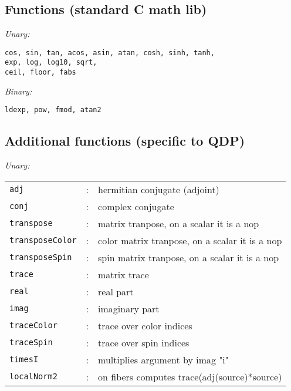 \documentclass[12pt,letterpaper]{article}
\begin{document}
\medskip


\subsection{Functions (standard C math lib)}
\label{sec:cfuncs}

\noindent
{\em Unary:}

\begin{verbatim}
cos, sin, tan, acos, asin, atan, cosh, sinh, tanh,
exp, log, log10, sqrt,
ceil, floor, fabs
\end{verbatim}

\noindent
{\em Binary:}

\begin{verbatim}
ldexp, pow, fmod, atan2
\end{verbatim}

\medskip


\subsection{Additional functions (specific to QDP)}
\label{sec:funcs}

\noindent
{\em Unary:}

\begin{flushleft}
\begin{tabular}{lcp{4.0in}}
\verb|adj|              &:& hermitian conjugate (adjoint)\\
\verb|conj|             &:& complex conjugate\\
\verb|transpose|        &:& matrix tranpose, on a scalar it is a nop\\
\verb|transposeColor|   &:& color matrix tranpose, on a scalar it is a nop\\
\verb|transposeSpin|    &:& spin matrix tranpose, on a scalar it is a nop\\
\verb|trace|            &:& matrix trace\\
\verb|real|             &:& real part\\
\verb|imag|             &:& imaginary part\\
\verb|traceColor|       &:& trace over color indices\\
\verb|traceSpin|        &:& trace over spin indices\\
\verb|timesI|           &:& multiplies argument by imag "i"\\
\verb|localNorm2|       &:& on fibers computes trace(adj(source)*source)\\
\end{tabular}
\end{flushleft}
\end{document}
